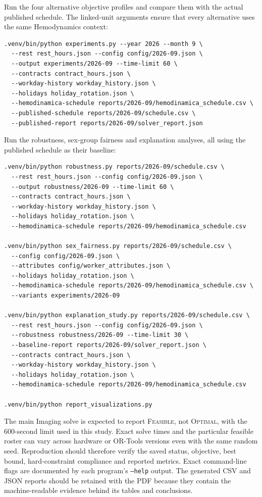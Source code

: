 \documentclass[11pt,a4paper]{article}
\newcommand{\code}[1]{\texttt{#1}}
\begin{document}
Run the four alternative objective profiles and compare them with the actual published schedule. The linked-unit arguments ensure that every alternative uses the same Hemodynamics context:

\begin{small}
\begin{verbatim}
.venv/bin/python experiments.py --year 2026 --month 9 \
  --rest rest_hours.json --config config/2026-09.json \
  --output experiments/2026-09 --time-limit 60 \
  --contracts contract_hours.json \
  --workday-history workday_history.json \
  --holidays holiday_rotation.json \
  --hemodinamica-schedule reports/2026-09/hemodinamica_schedule.csv \
  --published-schedule reports/2026-09/schedule.csv \
  --published-report reports/2026-09/solver_report.json
\end{verbatim}
\end{small}

Run the robustness, sex-group fairness and explanation analyses, all using the published schedule as their baseline:

\begin{small}
\begin{verbatim}
.venv/bin/python robustness.py reports/2026-09/schedule.csv \
  --rest rest_hours.json --config config/2026-09.json \
  --output robustness/2026-09 --time-limit 60 \
  --contracts contract_hours.json \
  --workday-history workday_history.json \
  --holidays holiday_rotation.json \
  --hemodinamica-schedule reports/2026-09/hemodinamica_schedule.csv

.venv/bin/python sex_fairness.py reports/2026-09/schedule.csv \
  --config config/2026-09.json \
  --attributes config/worker_attributes.json \
  --holidays holiday_rotation.json \
  --hemodinamica-schedule reports/2026-09/hemodinamica_schedule.csv \
  --variants experiments/2026-09

.venv/bin/python explanation_study.py reports/2026-09/schedule.csv \
  --rest rest_hours.json --config config/2026-09.json \
  --robustness robustness/2026-09 --time-limit 30 \
  --baseline-report reports/2026-09/solver_report.json \
  --contracts contract_hours.json \
  --workday-history workday_history.json \
  --holidays holiday_rotation.json \
  --hemodinamica-schedule reports/2026-09/hemodinamica_schedule.csv

.venv/bin/python report_visualizations.py
\end{verbatim}
\end{small}

The main Imaging solve is expected to report \textsc{Feasible}, not \textsc{Optimal}, with the 600-second limit used in this study. Exact solve times and the particular feasible roster can vary across hardware or OR-Tools versions even with the same random seed. Reproduction should therefore verify the saved status, objective, best bound, hard-constraint compliance and reported metrics. Exact command-line flags are documented by each program's \code{--help} output. The generated CSV and JSON reports should be retained with the PDF because they contain the machine-readable evidence behind its tables and conclusions.
\end{document}
